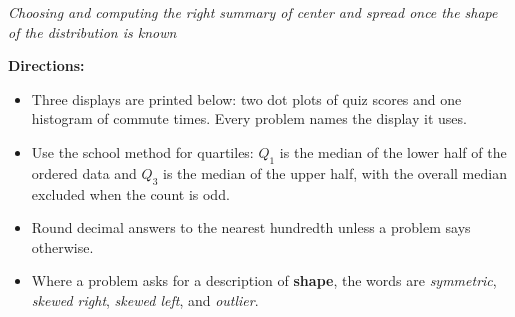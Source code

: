 \documentclass[12pt]{article}
\begin{document}

\begin{center}\small\textit{Choosing and computing the right summary of center and spread
once the shape of the distribution is known}\end{center}

\noindent\small\textbf{Directions:}
\begin{itemize}[label={$\bullet$}, leftmargin=1.1cm, itemsep=1pt, topsep=2pt]
  \item Three displays are printed below: two dot plots of quiz scores and one histogram of
        commute times. Every problem names the display it uses.
  \item Use the school method for quartiles: $Q_1$ is the median of the lower half of the
        ordered data and $Q_3$ is the median of the upper half, with the overall median
        excluded when the count is odd.
  \item Round decimal answers to the nearest hundredth unless a problem says otherwise.
  \item Where a problem asks for a description of \textbf{shape}, the words are
        \emph{symmetric}, \emph{skewed right}, \emph{skewed left}, and \emph{outlier}.
\end{itemize}
\normalsize
\end{document}
